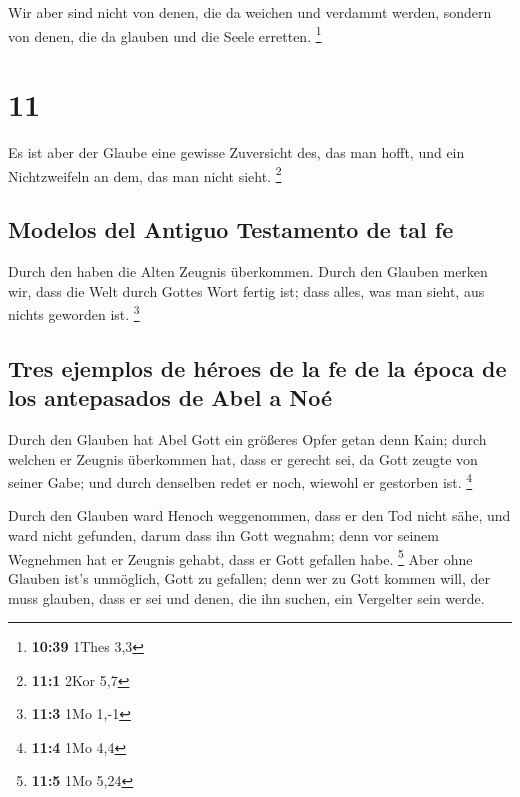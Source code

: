  Wir aber sind nicht von denen, die da weichen und
verdammt werden, sondern von denen, die da glauben und die Seele
erretten. \footnote{\textbf{10:39} 1Thes 3,3}

\hypertarget{section-10}{%
\section{11}\label{section-10}}

 Es ist aber der Glaube eine gewisse Zuversicht des, das
man hofft, und ein Nichtzweifeln an dem, das man nicht sieht.
\footnote{\textbf{11:1} 2Kor 5,7}

\hypertarget{modelos-del-antiguo-testamento-de-tal-fe}{%
\subsection{Modelos del Antiguo Testamento de tal
fe}\label{modelos-del-antiguo-testamento-de-tal-fe}}

 Durch den haben die Alten Zeugnis überkommen.
 Durch den Glauben merken wir, dass die Welt durch Gottes
Wort fertig ist; dass alles, was man sieht, aus nichts geworden ist.
\footnote{\textbf{11:3} 1Mo 1,-1}

\hypertarget{tres-ejemplos-de-huxe9roes-de-la-fe-de-la-uxe9poca-de-los-antepasados-de-abel-a-nouxe9}{%
\subsection{Tres ejemplos de héroes de la fe de la época de los
antepasados \hspace{0pt}\hspace{0pt}de Abel a
Noé}\label{tres-ejemplos-de-huxe9roes-de-la-fe-de-la-uxe9poca-de-los-antepasados-de-abel-a-nouxe9}}

 Durch den Glauben hat Abel Gott ein größeres Opfer getan
denn Kain; durch welchen er Zeugnis überkommen hat, dass er gerecht sei,
da Gott zeugte von seiner Gabe; und durch denselben redet er noch,
wiewohl er gestorben ist. \footnote{\textbf{11:4} 1Mo 4,4}

 Durch den Glauben ward Henoch weggenommen, dass er den
Tod nicht sähe, und ward nicht gefunden, darum dass ihn Gott wegnahm;
denn vor seinem Wegnehmen hat er Zeugnis gehabt, dass er Gott gefallen
habe. \footnote{\textbf{11:5} 1Mo 5,24}  Aber ohne Glauben
ist's unmöglich, Gott zu gefallen; denn wer zu Gott kommen will, der
muss glauben, dass er sei und denen, die ihn suchen, ein Vergelter sein
werde.

